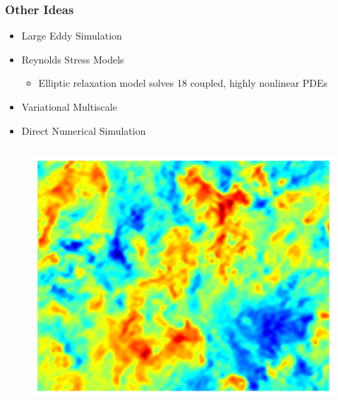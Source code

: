 \documentclass{beamer}
\begin{document}
\begin{frame}\frametitle{Other Ideas}
\begin{itemize}
	\item Large Eddy Simulation
	\item Reynolds Stress Models
	\begin{itemize}
		\item Elliptic relaxation model solves 18 coupled, highly nonlinear PDEs
	\end{itemize}
	\item Variational Multiscale
	\item Direct Numerical Simulation
\end{itemize}
\begin{columns}[T]
\begin{column}{0.3\textwidth}
\begin{figure}[c]
	\begin{center}
		\includegraphics[width=\textwidth]{DNS_Velocity_Field.png}


\end{center}
\end{figure}
\end{column}
\end{columns}
\end{frame}
\end{document}
